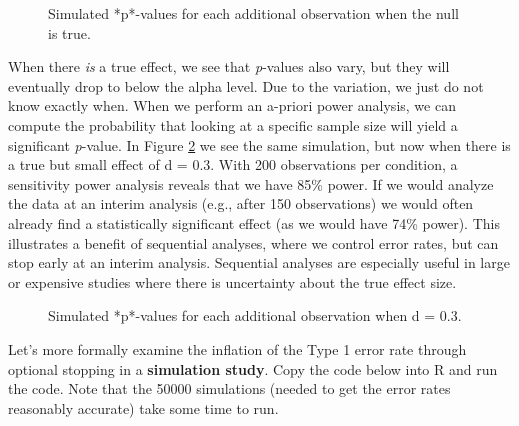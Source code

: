 \documentclass[
]{krantz}
\begin{document}
\begin{figure}

{\centering {}

}

\caption[Simulated *p*-values for each additional observation when the null is true]{Simulated *p*-values for each additional observation when the null is true.}\label{fig:animatep}
\end{figure}

When there \emph{is} a true effect, we see that \emph{p}-values also vary, but they will eventually drop to below the alpha level. Due to the variation, we just do not know exactly when. When we perform an a-priori power analysis, we can compute the probability that looking at a specific sample size will yield a significant \emph{p}-value. In Figure \ref{fig:animatep2} we see the same simulation, but now when there is a true but small effect of d = 0.3. With 200 observations per condition, a sensitivity power analysis reveals that we have 85\% power. If we would analyze the data at an interim analysis (e.g., after 150 observations) we would often already find a statistically significant effect (as we would have 74\% power). This illustrates a benefit of sequential analyses, where we control error rates, but can stop early at an interim analysis. Sequential analyses are especially useful in large or expensive studies where there is uncertainty about the true effect size.

\begin{figure}

{\centering {}

}

\caption[Simulated *p*-values for each additional observation when d = 0.3]{Simulated *p*-values for each additional observation when d = 0.3.}\label{fig:animatep2}
\end{figure}

Let's more formally examine the inflation of the Type 1 error rate through optional stopping in a \textbf{simulation study}. Copy the code below into R and run the code. Note that the 50000 simulations (needed to get the error rates reasonably accurate) take some time to run.
\end{document}
